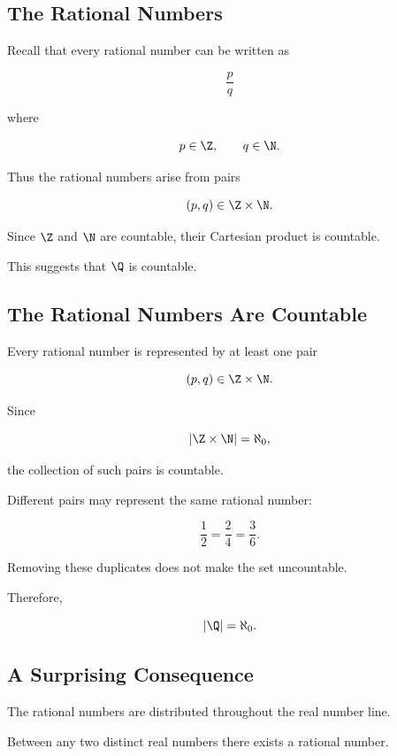 \subsection{The Rational Numbers}
\label{subsec:rational-countability}

Recall that every rational number can be written as

\[ \frac pq \]

where

\[ p\in\Z,\qquad q\in\N. \]

Thus the rational numbers arise from pairs

\[ (p,q)\in\Z\times\N. \]

Since \(\Z\) and \(\N\) are countable, their Cartesian product is countable.

This suggests that \(\Q\) is countable.

\subsection{The Rational Numbers Are Countable}
\label{subsec:q-countable}

Every rational number is represented by at least one pair

\[ (p,q)\in\Z\times\N. \]

Since

\[ |\Z\times\N|=\aleph_0, \]

the collection of such pairs is countable.

Different pairs may represent the same rational number:

\[ \frac12=\frac24=\frac36. \]

Removing these duplicates does not make the set uncountable.

Therefore,

\[ |\Q|=\aleph_0. \]

\subsection{A Surprising Consequence}
\label{subsec:q-surprising}

The rational numbers are distributed throughout the real number line.

Between any two distinct real numbers there exists a rational number.

